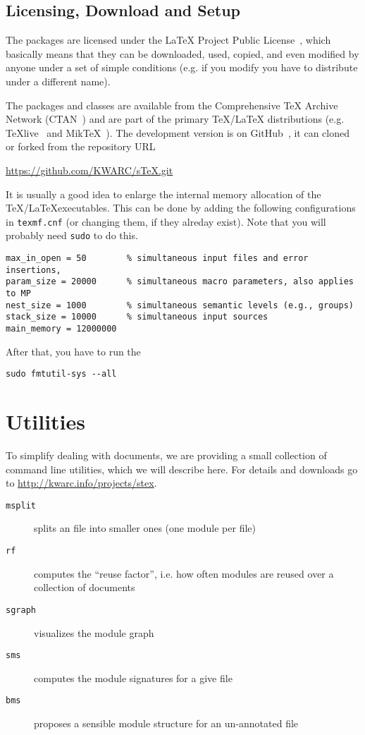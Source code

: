 \documentclass{article}
\begin{document}
\subsection{Licensing, Download and Setup}\label{sec:setup}
 
The {\stex} packages are licensed under the {\LaTeX} Project Public License~\cite{LPPL},
which basically means that they can be downloaded, used, copied, and even modified by
anyone under a set of simple conditions (e.g. if you modify you have to distribute under a
different name). 

The {\stex} packages and classes are available from the Comprehensive {\TeX} Archive
Network (CTAN~\cite{CTAN:on}) and are part of the primary {\TeX/\LaTeX} distributions
(e.g. TeXlive~\cite{TeXLive:on} and MikTeX~\cite{MiKTeX:on}). The development version is
on GitHub~\cite{sTeX:github:on}, it can cloned or forked from the repository URL
\begin{center}
  \url{https://github.com/KWARC/sTeX.git}
\end{center}
It is usually a good idea to enlarge the internal memory allocation of the \TeX/\LaTeX executables. This can be done by
adding the following configurations in \texttt{texmf.cnf} (or changing them, if they
alreday exist). Note that you will probably need \texttt{sudo} to do this. 
\begin{lstlisting}
max_in_open = 50        % simultaneous input files and error insertions, 
param_size = 20000      % simultaneous macro parameters, also applies to MP
nest_size = 1000        % simultaneous semantic levels (e.g., groups)
stack_size = 10000      % simultaneous input sources
main_memory = 12000000
\end{lstlisting}
After that, you have to run the 
\begin{lstlisting}
sudo fmtutil-sys --all
\end{lstlisting}

\section{Utilities}\label{sec:utilities}

To simplify dealing with {\stex} documents, we are providing a small collection of command
line utilities, which we will describe here. For details and downloads go to
{\url{http://kwarc.info/projects/stex}}.

\begin{description}
\item[{\tt{msplit}}] splits an {\stex} file into smaller ones (one module per file)
\item[{\tt{rf}}] computes the ``reuse factor'', i.e. how often {\stex} modules are reused
  over a collection of documents 
\item[{\tt{sgraph}}] visualizes the module graph
\item[{\tt{sms}}] computes the {\stex} module signatures for a give {\stex} file
\item[{\tt{bms}}] proposes a sensible module structure for an un-annotated {\stex} file
\end{description}
\printbibliography
\end{document}
